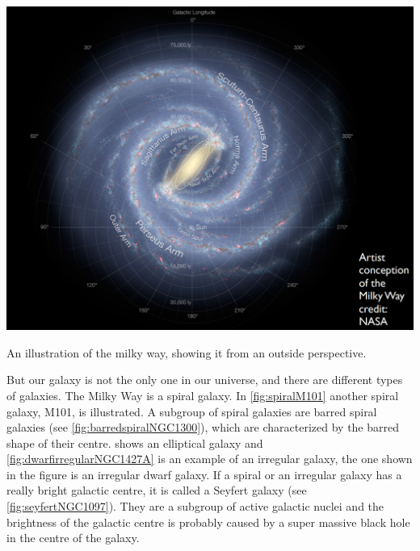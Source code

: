 \begin{marginfigure}
	\centering
		\includegraphics[width=\textwidth]{img/ch-01/milkywayfromoutside.png}
		\caption{An illustration of the milky way, showing it from an outside perspective.}
		\label{fig:milkywayoutside}
\end{marginfigure}
But our galaxy is not the only one in our universe, and there are different types of galaxies. The Milky Way is a spiral galaxy. In \cref{fig:spiralM101} another spiral galaxy, M101, is illustrated. A subgroup of spiral galaxies are barred spiral galaxies (see \cref{fig:barredspiralNGC1300}), which are characterized by the barred shape of their centre.  shows an elliptical galaxy and \cref{fig:dwarfirregularNGC1427A} is an example of an irregular galaxy, the one shown in the figure is an irregular dwarf galaxy. If a spiral or an irregular galaxy has a really bright galactic centre, it is called a Seyfert galaxy (see \cref{fig:seyfertNGC1097}). They are a subgroup of active galactic nuclei and the brightness of the galactic centre is probably caused by a super massive black hole in the centre of the galaxy. 
